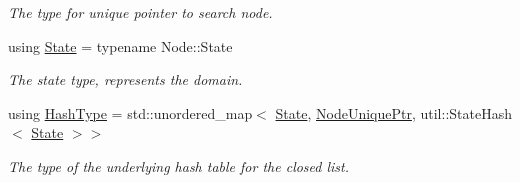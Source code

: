 \begin{DoxyCompactItemize}
\begin{DoxyCompactList}\small\item\em The type for unique pointer to search node. \end{DoxyCompactList}\item 
using \hyperlink{structOpenClosedList_a64fd043b1581700f6de43d540f1c39d6}{State} = typename Node\+::\+State\hypertarget{structOpenClosedList_a64fd043b1581700f6de43d540f1c39d6}{}\label{structOpenClosedList_a64fd043b1581700f6de43d540f1c39d6}

\begin{DoxyCompactList}\small\item\em The state type, represents the domain. \end{DoxyCompactList}\item 
using \hyperlink{structOpenClosedList_a4d6714df3a19f272fef2f0ca7fb7a1b7}{Hash\+Type} = std\+::unordered\+\_\+map$<$ \hyperlink{structOpenClosedList_a64fd043b1581700f6de43d540f1c39d6}{State}, \hyperlink{structOpenClosedList_a9dbc60979a564fc7d5d0ff563f5406a1}{Node\+Unique\+Ptr}, util\+::\+State\+Hash$<$ \hyperlink{structOpenClosedList_a64fd043b1581700f6de43d540f1c39d6}{State} $>$$>$\hypertarget{structOpenClosedList_a4d6714df3a19f272fef2f0ca7fb7a1b7}{}\label{structOpenClosedList_a4d6714df3a19f272fef2f0ca7fb7a1b7}

\begin{DoxyCompactList}\small\item\em The type of the underlying hash table for the closed list. \end{DoxyCompactList}\end{DoxyCompactItemize}
